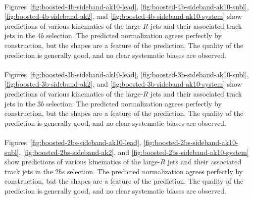 \paragraph{}
Figures~\ref{fig:boosted-4b-sideband-ak10-lead}, \ref{fig:boosted-4b-sideband-ak10-subl}, \ref{fig:boosted-4b-sideband-ak2},  and \ref{fig:boosted-4b-sideband-ak10-system} show predictions of various kinematics of the large-$R$ jets and their associated track jets in the $4b$ selection. The predicted normalization agrees perfectly by construction, but the shapes are a feature of the prediction. The quality of the prediction is generally good, and no clear systematic biases are observed.


\paragraph{}
Figures~\ref{fig:boosted-3b-sideband-ak10-lead}, \ref{fig:boosted-3b-sideband-ak10-subl}, \ref{fig:boosted-3b-sideband-ak2},  and \ref{fig:boosted-3b-sideband-ak10-system} show predictions of various kinematics of the large-$R$ jets and their associated track jets in the $3b$ selection. The predicted normalization agrees perfectly by construction, but the shapes are a feature of the prediction. The quality of the prediction is generally good, and no clear systematic biases are observed.


\paragraph{}
Figures~\ref{fig:boosted-2bs-sideband-ak10-lead}, \ref{fig:boosted-2bs-sideband-ak10-subl}, \ref{fig:boosted-2bs-sideband-ak2},  and \ref{fig:boosted-2bs-sideband-ak10-system} show predictions of various kinematics of the large-$R$ jets and their associated track jets in the 2$bs$ selection. The predicted normalization agrees perfectly by construction, but the shapes are a feature of the prediction. The quality of the prediction is generally good, and no clear systematic biases are observed.


